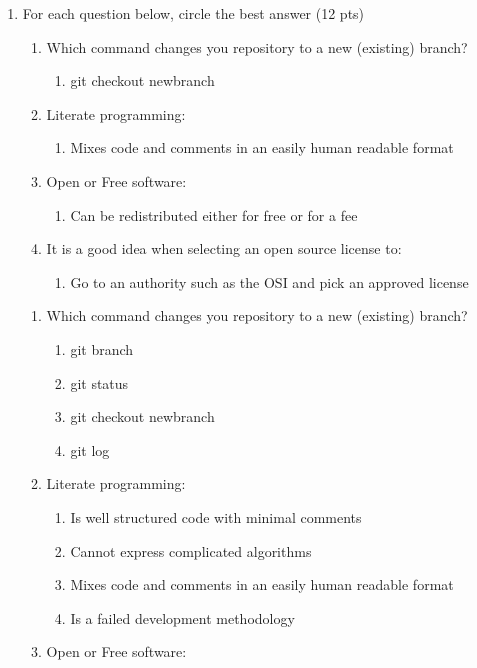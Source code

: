 \documentclass[10pt]{article}
\begin{document}
\begin{enumerate}
\item For each question below, circle the best answer (12 pts)
\beginanswers
\begin{enumerate}
	\item Which command changes you repository to a new (existing) branch?
	\begin{enumerate}
		\item git checkout newbranch
	\end{enumerate}
	\item Literate programming:
	\begin{enumerate}
		\item Mixes code and comments in an easily human readable format
	\end{enumerate}
	\item Open or Free software:
	\begin{enumerate}
		\item Can be redistributed either for free or for a fee
	\end{enumerate}
	\item It is a good idea when selecting an open source license to:
	\begin{enumerate}
		\item Go to an authority such as the OSI and pick an approved license
	\end{enumerate}
\end{enumerate}
\else
\begin{enumerate}
	\item Which command changes you repository to a new (existing) branch?
	\begin{enumerate}
		\item git branch
		\item git status
		\item git checkout newbranch
		\item git log
	\end{enumerate}
 	\item Literate programming:
 	\begin{enumerate}
 		\item Is well structured code with minimal comments
 		\item Cannot express complicated algorithms
 		\item Mixes code and comments in an easily human readable format
 		\item Is a failed development methodology
 	\end{enumerate}
 	\item Open or Free software:

\end{enumerate}
\end{enumerate}
\end{document}
